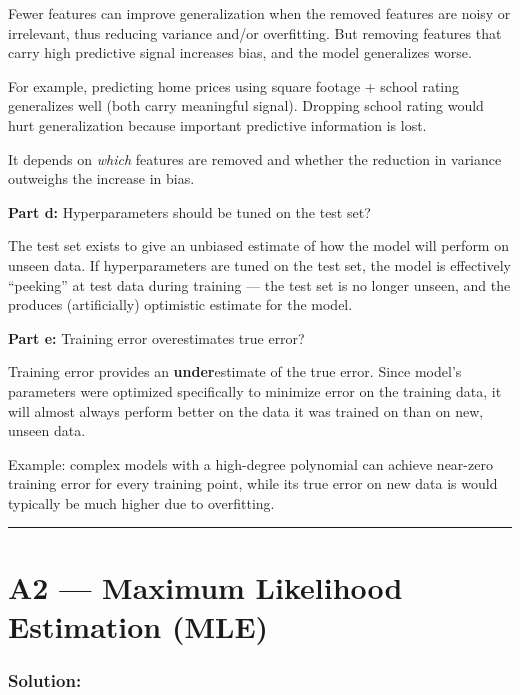 \documentclass{article}
\begin{document}

Fewer features can improve generalization when the removed features are noisy or irrelevant, thus reducing variance and/or overfitting. But removing features that carry high predictive signal increases bias, and the model generalizes worse.

For example, predicting home prices using square footage + school rating generalizes well (both carry meaningful signal). Dropping school rating would hurt generalization because important predictive information is lost.

It depends on \textit{which} features are removed and whether the reduction in variance outweighs the increase in bias.

\bigskip
\begin{mdframed}
\textbf{\large Part d:} Hyperparameters should be tuned on the test set?
\end{mdframed}


The test set exists to give an unbiased estimate of how the model will perform on unseen data. If hyperparameters are tuned on the test set, the model is effectively ``peeking'' at test data during training --- the test set is no longer unseen, and the produces (artificially) optimistic estimate for the model.

\bigskip
\begin{mdframed}
\textbf{\large Part e:} Training error overestimates true error?
\end{mdframed}


Training error provides an \textbf{under}estimate of the true error. Since model's parameters were optimized specifically to minimize error on the training data, it will almost always perform better on the data it was trained on than on new, unseen data.

Example: complex models with a high-degree polynomial can achieve near-zero training error for every training point, while its true error on new data is would typically be much higher due to overfitting.

\noindent\rule{\textwidth}{0.4pt}

\clearpage{}
\section*{A2 --- Maximum Likelihood Estimation (MLE)}

\subsubsection*{Solution:}
\end{document}
